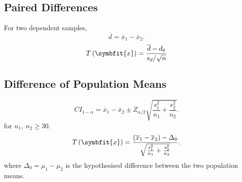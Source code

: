 \documentclass{article}
\begin{document}
\begin{multicols}{3}
    \subsection{Paired Differences}
    For two dependent samples,
    \begin{equation*}
        \overline{d} = \overline{x}_1 - \overline{x}_2.
    \end{equation*}
    \begin{equation*}
        T\left( \symbfit{x} \right) = \frac{\overline{d} - d_0}{s_d / \sqrt{n}}
    \end{equation*}
    \subsection{Difference of Population Means}
    \begin{equation*}
        {CI}_{1-\alpha} = \overline{x}_1 - \overline{x}_2 \pm Z_{\alpha/2} \sqrt{\frac{s_1^2}{n_1} + \frac{s_2^2}{n_2}}.
    \end{equation*}
    for \(n_1,\: n_2 \geq 30\).
    \begin{equation*}
        T\left( \symbfit{x} \right) = \frac{\left( \overline{x}_1 - \overline{x}_2 \right) - \Delta_0}{\sqrt{\frac{s_1^2}{n_1} + \frac{s_2^2}{n_2}}}.
    \end{equation*}
    where \(\Delta_0 = \mu_1 - \mu_2\) is the hypothesised difference between the two population means.


\end{multicols}
\end{document}
